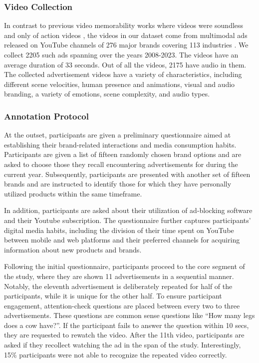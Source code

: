 \subsubsection{Video Collection}
\label{sec:Video Collection}
In contrast to previous video memorability works where videos were soundless and only of action videos \cite{newman2020multimodal, cohendet2019videomem}, the videos in our dataset come from multimodal ads released on YouTube channels of 276 major brands covering 113 industries%
. We collect 2205 such ads spanning over the years 2008-2023. The videos have an average duration of 33 seconds. Out of all the videos, 2175 have audio in them. The collected advertisement videos have a variety of characteristics, including different scene velocities, human presence and animations, visual and audio branding, a variety of emotions, scene complexity, and audio types. 




\subsubsection{Annotation Protocol}
\label{sec:Annotation Protocol}
At the outset, participants are given a preliminary questionnaire aimed at establishing their brand-related interactions and media consumption habits. Participants are given a list of fifteen randomly chosen brand options and are asked to choose those they recall encountering advertisements for during the current year. Subsequently, participants are presented with another set of fifteen brands and are instructed to identify those for which they have personally utilized products within the same timeframe. 

In addition, participants are asked about their utilization of ad-blocking software and their Youtube subscription. The questionnaire further captures participants' digital media habits, including the division of their time spent on YouTube between mobile and web platforms and their preferred channels for acquiring information about new products and brands.

Following the initial questionnaire, participants proceed to the core segment of the study, where they are shown 11 advertisements in a sequential manner. Notably, the eleventh advertisement is deliberately repeated for half of the participants, while it is unique for the other half. To ensure participant engagement, attention-check questions are placed between every two to three advertisements. These questions are common sense questions like ``How many legs does a cow have?''. If the participant fails to answer the question within 10 secs, they are requested to rewatch the video. After the 11th video, participants are asked if they recollect watching the ad in the span of the study. Interestingly, 15\% participants were not able to recognize the repeated video correctly. 



